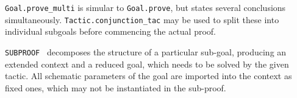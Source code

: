 \begin{isabellebody}
\begin{isamarkuptext}
\begin{description}
  \item \verb|Goal.prove_multi| is simular to \verb|Goal.prove|, but
  states several conclusions simultaneously.  \verb|Tactic.conjunction_tac| may be used to split these into individual
  subgoals before commencing the actual proof.

  \item \verb|SUBPROOF|~ decomposes the structure of a
  particular sub-goal, producing an extended context and a reduced
  goal, which needs to be solved by the given tactic.  All schematic
  parameters of the goal are imported into the context as fixed ones,
  which may not be instantiated in the sub-proof.

  \end{description}%
\end{isamarkuptext}%
\isamarkuptrue%
%
\endisatagmlref
{\isafoldmlref}%
%
\isadelimmlref
%
\endisadelimmlref
%
\isadelimtheory
%
\endisadelimtheory
%
\isatagtheory
{}\isamarkupfalse%
%
\endisatagtheory
{\isafoldtheory}%
%
\isadelimtheory
%
\endisadelimtheory
\isanewline
\end{isabellebody}%
